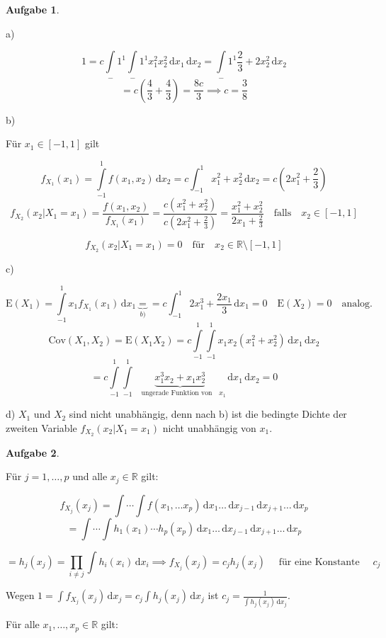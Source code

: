 \documentclass[12pt, a4paper]{article}
\newcommand{\E}{\mbox{I\negthinspace E}}
\theoremstyle{plain}
\theoremstyle{definition}
\newtheorem{aufgabe}{Aufgabe}
\newcommand{\R}{\mathbb{R}}
\newcommand{\1}{\mathds{1}}
\renewcommand{\E}{\mathrm{E}}
\newcommand{\Cov}{\mathrm{Cov}}
\renewcommand{\d}{\,\mathrm{d}}
\providecommand{\mtext}[1]{\quad \text{#1} \quad}
\begin{document}
\begin{aufgabe} 
\end{aufgabe}
a)

\[  1 = c \int\limits_-1^1  \int\limits_-1^1 x_1^2 x_2^2 \d x_1 \d x_2 = \int\limits_-1^1  \frac{2}{3} + 2 x_2^2 \d x_2   \] 
\[  = c( \frac{4}{3} + \frac{4}{3} ) = \frac{8c}{3}  \implies c = \frac{3}{8}    \]

b)

Für $x_1 \in [-1, 1]$ gilt

\[   f_{X_1}(x_1) = \int\limits_{-1}^1 f(x_1, x_2) \d x_2  = c \int_{-1}^1 x_1^2 + x_2^2 \d x_2 = c(2x_1^2 + \frac{2}{3})  \]
\[   f_{X_2}(x_2 | X_1 = x_1) = \frac{f(x_1, x_2)}{f_{X_1} (x_1) } = \frac{c(x_1^2 + x_2^2 ) }{c(2x_1^2 + \frac{2}{3})}  = \frac{x_1^2 + x_2^2}{2x_1 + \frac{2}{3}} \mtext{falls} x_2 \in [-1, 1]  \]

\[   f_{X_2}(x_2|X_1 = x_1) = 0 \mtext{für} x_2 \in \R \setminus [-1, 1]    \]

c)

\[  \E(X_1) = \int\limits_{-1}^1 x_1 f_{X_1}(x_1)\d x_1 \underbrace{=}_{b)} = c\int_{-1}^1 2x_1^3 + \frac{2x_1}{3} \d x_1  = 0 \quad \E(X_2) = 0 \mtext{analog.}    \]
\[   \Cov(X_1, X_2) = \E(X_1 X_2) = c \int\limits_{-1}^1 \int\limits_{-1}^1  x_1 x_2 (x_1^2 + x_2^2) \d x_1 \d x_2   \]
\[   = c \int\limits_{-1}^1 \int\limits_{-1}^1 \underbrace{x_1^3 x_2 + x_1 x_2^3}_{\mtext{ungerade Funktion von} x_1} \d x_1 \d x_2  = 0  \]

d) $X_1$ und $X_2$ sind nicht unabhängig, denn nach b) ist die bedingte Dichte der zweiten Variable $f_{X_2}(x_2 | X_1 = x_1)$ nicht unabhängig von $x_1$.\\


\begin{aufgabe} 
\end{aufgabe}

Für $j = 1, \ldots, p$ und alle $x_j \in \R$ gilt:

\[  f_{X_j} (x_j) = \int \cdots \int f (x_1, \ldots x_p) \d x_1 \ldots \d x_{j-1} \d x_{j+1} \ldots \d x_p \]
\[= \int \cdots \int h_1 (x_1) \cdots h_p (x_p )  \d x_1 \ldots \d x_{j-1} \d x_{j+1} \ldots \d x_p   \]

\[  = h_j (x_j) = \prod_{i \neq j} \int h_i (x_i) \d x_i \implies   f_{X_j}(x_j) = c_j h_j (x_j) \mtext{ für eine Konstante } c_j   \]

Wegen $1 = \int f_{X_j} (x_j) \d x_j = c_j \int h_j (x_j) \d x_j$ ist $ c_j = \frac{1}{\int h_j (x_j) \d x_j}$.

Für alle $x_1, \ldots, x_p \in \R$ gilt:
\end{document}

